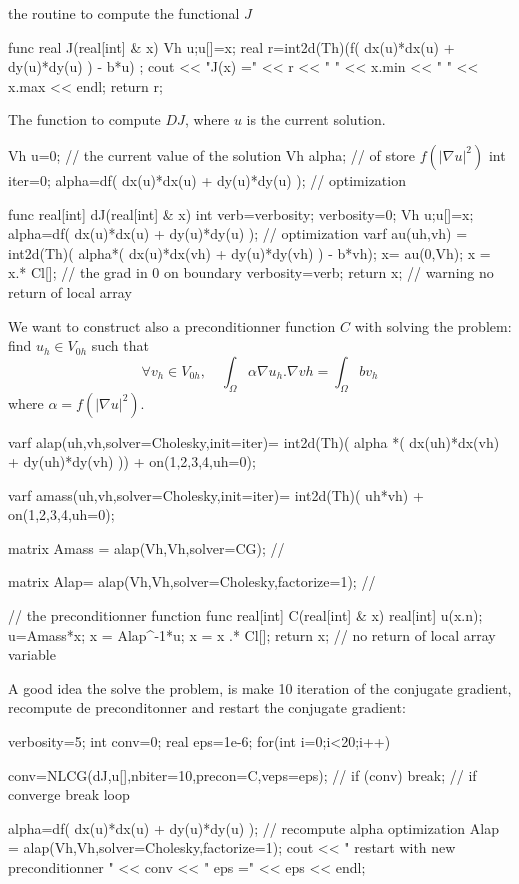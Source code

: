 \documentclass[twoside]{book}
\begin{document}
the routine to compute the functional $J$
\bFF

func real J(real[int] & x)
  {
    Vh u;u[]=x; 
    real r=int2d(Th)(f( dx(u)*dx(u) + dy(u)*dy(u) ) - b*u) ;
    cout << "J(x) =" << r << " " << x.min <<  " " << x.max << endl;
    return r;
  }
\eFF

The function  to compute $D J$, where $u$ is the current solution.
\bFF

Vh u=0; //  the current value of the solution
Vh alpha; // of store  $f(|\nabla u|^2)$
int iter=0;
alpha=df( dx(u)*dx(u) + dy(u)*dy(u) ); // optimization 

func real[int] dJ(real[int] & x)
  {
    int verb=verbosity; verbosity=0; 
    Vh u;u[]=x; 
    alpha=df( dx(u)*dx(u) + dy(u)*dy(u) ); // optimization 
    varf au(uh,vh) = int2d(Th)( alpha*( dx(u)*dx(vh) + dy(u)*dy(vh) ) - b*vh);
    x= au(0,Vh);  
    x = x.* Cl[]; //  the grad in 0 on boundary 
    verbosity=verb;
    return x; // warning no return of local array  
  }
\eFF

We want to construct also a preconditionner function $C$
with solving the problem:  find $u_h \in V_{0h}$ such that
$$\forall v_h \in V_{0h}, \quad  \int_\Omega \alpha \nabla u_h . \nabla vh = \int_\Omega b v_h  $$
where $ \alpha=f(|\nabla u|^2)$.
\bFF

varf alap(uh,vh,solver=Cholesky,init=iter)=  
   int2d(Th)( alpha *( dx(uh)*dx(vh) + dy(uh)*dy(vh) ))   + on(1,2,3,4,uh=0);

varf amass(uh,vh,solver=Cholesky,init=iter)=  int2d(Th)( uh*vh)  + on(1,2,3,4,uh=0);

matrix Amass = alap(Vh,Vh,solver=CG); // 

matrix Alap=  alap(Vh,Vh,solver=Cholesky,factorize=1);   // 

// the preconditionner function
func real[int] C(real[int] & x)
{
   real[int] u(x.n);
   u=Amass*x;
   x = Alap^-1*u; 
   x = x .* Cl[];     
   return x; // no return of local array  variable 
}
\eFF

A good idea the solve the problem, is make 10 iteration of the conjugate gradient, 
recompute de preconditonner and restart the conjugate gradient:
\bFF

   verbosity=5;
   int conv=0;
   real eps=1e-6; 
   for(int i=0;i<20;i++)
   {
     conv=NLCG(dJ,u[],nbiter=10,precon=C,veps=eps); // 
     if (conv) break;  // if converge break loop
    
     alpha=df( dx(u)*dx(u) + dy(u)*dy(u) ); // recompute alpha optimization 
     Alap = alap(Vh,Vh,solver=Cholesky,factorize=1);   
     cout << " restart with new preconditionner " << conv << " eps =" << eps << endl;
   }
\end{document}
